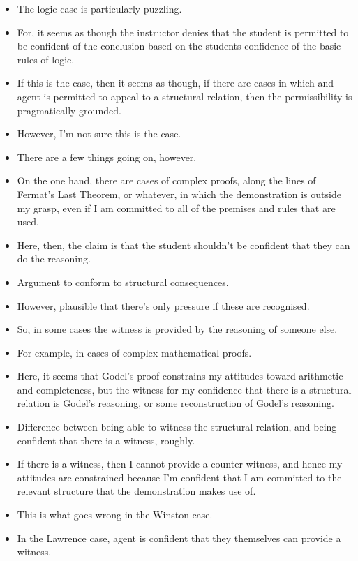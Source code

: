 \documentclass[10pt]{article}
\begin{document}
\begin{itemize}
\item The logic case is particularly puzzling.
\item For, it seems as though the instructor denies that the student is permitted to be confident of the conclusion based on the students confidence of the basic rules of logic.
\item If this is the case, then it seems as though, if there are cases in which and agent is permitted to appeal to a structural relation, then the permissibility is pragmatically grounded.
\item However, I'm not sure this is the case.
\item There are a few things going on, however.
\item On the one hand, there are cases of complex proofs, along the lines of Fermat's Last Theorem, or whatever, in which the demonstration is outside my grasp, even if I am committed to all of the premises and rules that are used.
\item Here, then, the claim is that the student shouldn't be confident that they can do the reasoning.
\end{itemize}

\newpage

\begin{itemize}
\item Argument to conform to structural consequences.
\item However, plausible that there's only pressure if these are recognised.
\item So, in some cases the witness is provided by the reasoning of someone else.
\item For example, in cases of complex mathematical proofs.
\item Here, it seems that Godel's proof constrains my attitudes toward arithmetic and completeness, but the witness for my confidence that there is a structural relation is Godel's reasoning, or some reconstruction of Godel's reasoning.
\item Difference between being able to witness the structural relation, and being confident that there is a witness, roughly.
\item If there is a witness, then I cannot provide a counter-witness, and hence my attitudes are constrained because I'm confident that I am committed to the relevant structure that the demonstration makes use of.
\item This is what goes wrong in the Winston case.
\item In the Lawrence case, agent is confident that they themselves can provide a witness.
\end{itemize}
\end{document}

